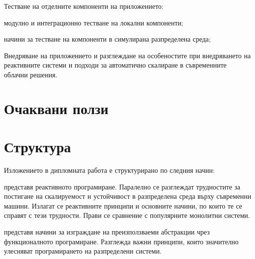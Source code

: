 \begin{itemize*}
  \item Тестване на отделните компоненти на приложението:
  \begin{itemize*}
    \item модулно и интеграционно тестване на локални компоненти;
    \item начини за тестване на компоненти в симулирана разпределена среда;
  \end{itemize*}
  \item Внедряване на приложението и разглеждане на особеностите при внедряването на реактивните системи и подходи за автоматично скалиране в съвременните облачни решения.
\end{itemize*}

\section{Очаквани ползи}

\section{Структура}

Изложението в дипломната работа е структурирано по следния начин:

\nopagebreak

 представя реактивното програмиране. Паралелно се разглеждат трудностите за постигане на скалируемост и устойчивост в разпределена среда върху съвременни машини. Излагат се реактивните принципи и основните начини, по които те се справят с тези трудности. Прави се сравнение с популярните монолитни системи.

 представя начини за изграждане на преизползваеми абстракции чрез функционалното програмиране. Разглежда важни принципи, които значително улесняват програмирането на разпределени системи.
